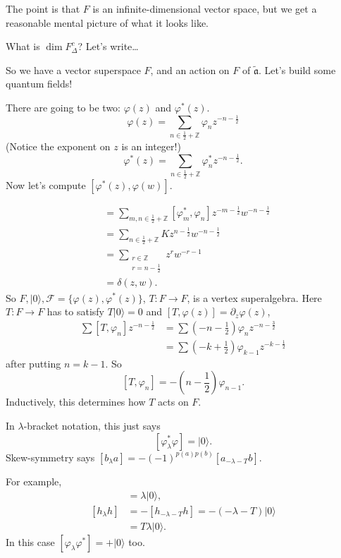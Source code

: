 The point is that $F$ is an infinite-dimensional
vector space, but we get a reasonable mental
picture of what it looks like.

What is $\dim F_\Delta^c$? Let's write…

\medskip\noindent
So we have a vector superspace $F$,
and an action on $F$ of $\tilde{\mathfrak{a}}$.
Let's build some quantum fields!

There are going to be two: $\varphi(z)$ 
and $\varphi^*(z)$.
$$
\varphi(z)=\sum_{n \in \frac{1}{2}+\mathbb{Z}}\varphi_nz^{-n-\frac{1}{2}}
$$
(Notice the exponent on $z$ is an integer!)
$$
\varphi^* (z)=\sum_{n \in \frac{1}{2}+\mathbb{Z}}
\varphi^*_n z^{-n-\frac{1}{2}}.
$$
Now let's compute $[\varphi^*(z),\varphi(w)]$.

\begin{align*}
[\varphi^*(z),\varphi(w)]&=\sum_{m,n \in \frac{1}{2}+\mathbb{Z}}
[\varphi^*_m,\varphi_n]z^{-m-\frac{1}{2}}w^{-n-\frac{1}{2}}\\
&=\sum_{n \in \frac{1}{2}+\mathbb{Z}}Kz^{n-\frac{1}{2}}w^{-n-\frac{1}{2}}\\
&=\sum_{\substack{r \in \mathbb{Z} \\ r=n-\frac{1}{2}}}z^rw^{-r-1}\\
&=\delta(z,w).
\end{align*}
So $F,|0\rangle,\mathcal{F}=\{\varphi(z),\varphi^*(z)\}$,
$T:F\to F$, is a vertex superalgebra.
Here $T:F \to F$ has to satisfy
$T|0\rangle=0$ and $[T,\varphi(z)]=\partial_z\varphi(z)$,
\begin{align*}
\sum [T,\varphi_n]z^{-n-\frac{1}{2}}&=
\sum (-n-\frac{1}{2})\varphi_n z^{-n-\frac{3}{2}}\\
&=\sum (-k+\frac{1}{2})\varphi_{k-1}z^{-k-\frac{1}{2}}
\end{align*}
after putting $n=k-1$. So
$$
[T,\varphi_n]=-(n-\frac{1}{2})\varphi_{n-1}.
$$
Inductively, this determines
how $T$ acts on $F$.

\medskip\noindent
In $\lambda$-bracket notation, this just says
$$
[\varphi^* _\lambda\varphi]=|0\rangle.
$$
Skew-symmetry says $[b_\lambda a]=-(-1)^{p(a)p(b)}[a_{-\lambda -T}b]$.

For example,
\begin{align*}
[h_\lambda h]&=\lambda |0\rangle,\\
[h_\lambda h]&=-[h_{-\lambda-T}h]=-(-\lambda-T)|0\rangle\\
&=T\lambda |0\rangle.
\end{align*}
In this case $[\varphi_\lambda \varphi^* ]=+|0\rangle$ too.

